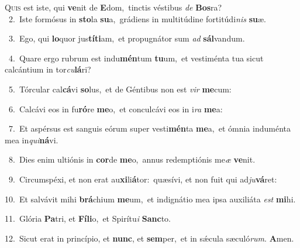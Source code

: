 \lettrine{\initial\textcolor{\initialcolor}{Q}}{uis} est iste, qui \textbf{ve}\-nit de \textbf{E}\-dom,~\star tinctis véstibus \textit{de} \textbf{Bos}\-ra?\\
{\numbfont\textcolor{\numbcolor}{~2.}}~Iste formósus in \textbf{sto}\-la \textbf{su}\-a,~\star grádiens in multitúdine fortitúdi\textit{nis} \textbf{su}\-æ.\par
{\numbfont\textcolor{\numbcolor}{~3.}}~Ego, qui \textbf{lo}\-quor jus\-\textbf{tí}\-\textbf{ti}am,~\star et propugnátor sum \textit{ad} \textbf{sál}\-vandum.\par
{\numbfont\textcolor{\numbcolor}{~4.}}~Quare ergo rubrum est indu\-\textbf{mén}\-tum \textbf{tu}\-um,~\star et vestiménta tua sicut calcántium in tor\-\textit{cu}\-\textbf{lá}ri?\par
{\numbfont\textcolor{\numbcolor}{~5.}}~Tórcular cal\-\textbf{cá}\-vi \textbf{so}\-lus,~\star et de Géntibus non est \textit{vir} \textbf{me}\-cum:\par
{\numbfont\textcolor{\numbcolor}{~6.}}~Calcávi eos in fu\-\textbf{ró}\-re \textbf{me}\-o,~\star et conculcávi eos in i\textit{ra} \textbf{me}\-a:\par
{\numbfont\textcolor{\numbcolor}{~7.}}~Et aspérsus est sanguis eórum super vesti\-\textbf{mén}\-ta \textbf{me}\-a,~\star et ómnia induménta mea in\-\textit{qui}\-\textbf{ná}vi.\par
{\numbfont\textcolor{\numbcolor}{~8.}}~Dies enim ultiónis in \textbf{cor}\-de \textbf{me}\-o,~\star annus redemptiónis me\textit{æ} \textbf{ve}\-nit.\par
{\numbfont\textcolor{\numbcolor}{~9.}}~Circumspéxi, et non erat au\-\textbf{xi}\-li\-\textbf{á}\-tor:~\star quæsívi, et non fuit qui ad\-\textit{ju}\-\textbf{vá}ret:\par
{\numbfont\textcolor{\numbcolor}{10.}}~Et salvávit mihi \textbf{brá}\-chium \textbf{me}\-um,~\star et indignátio mea ipsa auxiliáta \textit{est} \textbf{mi}\-hi.\par
{\numbfont\textcolor{\numbcolor}{11.}}~Glória \textbf{Pa}\-tri, et \textbf{Fí}\-\textbf{li}o,~\star et Spirítu\textit{i} \textbf{Sanc}\-to.\par
{\numbfont\textcolor{\numbcolor}{12.}}~Sicut erat in princípio, et \textbf{nunc}\-, et \textbf{sem}\-per,~\star et in sǽcula sæculó\-\textit{rum}\-. \textbf{A}\-men.\par
